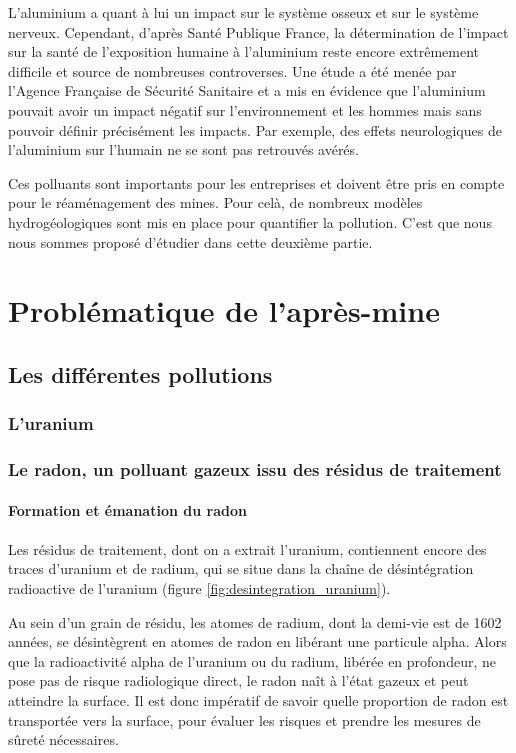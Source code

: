 \documentclass{article}
\begin{document}
L’aluminium a quant à lui un impact sur le système osseux et sur le système nerveux. Cependant, d’après Santé Publique France, la détermination de l'impact sur la santé de l'exposition humaine à l'aluminium reste encore extrêmement difficile et source de nombreuses controverses. Une étude a été menée par l’Agence Française de Sécurité Sanitaire et a mis en évidence que l’aluminium pouvait avoir un impact négatif sur l’environnement et les hommes mais sans pouvoir définir précisément les impacts.  Par exemple, des effets neurologiques de l’aluminium sur l’humain ne se sont pas retrouvés avérés.

Ces polluants sont importants pour les entreprises et doivent être pris en compte pour le réaménagement des mines. Pour celà, de nombreux modèles hydrogéologiques sont mis en place pour quantifier la pollution. C'est que nous nous sommes proposé d'étudier dans cette deuxième partie. 

\newpage
\section{Problématique de l’après-mine}
\subsection{Les différentes pollutions}
\subsubsection{L'uranium}

\subsubsection{Le radon, un polluant gazeux issu des résidus de traitement}

\paragraph{Formation et émanation du radon}

\paragraph{} Les résidus de traitement, dont on a extrait l’uranium, contiennent encore des traces d’uranium et de radium, qui se situe dans la chaîne de désintégration radioactive de l’uranium (figure \ref{fig:desintegration_uranium}).

Au sein d’un grain de résidu, les atomes de radium, dont la demi-vie est de 1602 années, se désintègrent en atomes de radon en libérant une particule alpha. Alors que la radioactivité alpha de l’uranium ou du radium, libérée en profondeur, ne pose pas de risque radiologique direct, le radon naît à l’état gazeux et peut atteindre la surface. Il est donc impératif de savoir quelle proportion de radon est transportée vers la surface, pour évaluer les risques et prendre les mesures de sûreté nécessaires.
\end{document}
